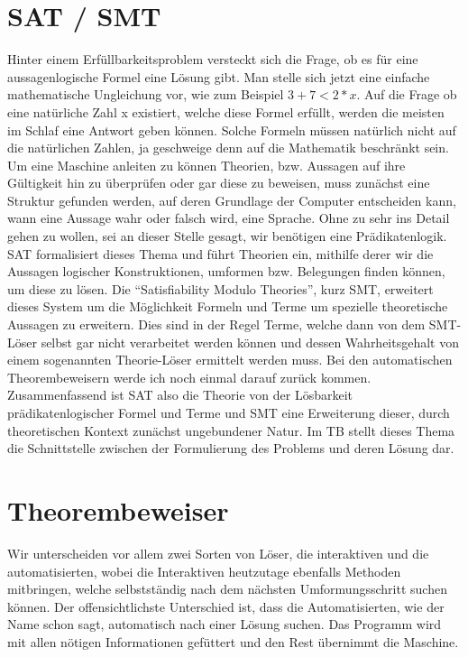 \section{SAT / SMT}
Hinter einem Erfüllbarkeitsproblem versteckt sich die Frage, ob es für eine aussagenlogische Formel eine Lösung gibt. Man stelle sich jetzt eine einfache
mathematische Ungleichung vor, wie zum Beispiel $3+7<2*x$. Auf die Frage ob eine natürliche Zahl x existiert, welche diese Formel erfüllt, werden die meisten im Schlaf
eine Antwort geben können. Solche Formeln müssen natürlich nicht auf die natürlichen Zahlen, ja geschweige denn auf die Mathematik beschränkt sein.
Um eine Maschine anleiten zu können Theorien, bzw. Aussagen auf ihre Gültigkeit hin zu überprüfen oder gar diese zu beweisen, muss zunächst eine Struktur
gefunden werden, auf deren Grundlage der Computer entscheiden kann, wann eine Aussage wahr oder falsch wird, eine Sprache. Ohne zu sehr ins Detail gehen zu
wollen, sei an dieser Stelle gesagt, wir benötigen eine Prädikatenlogik. SAT formalisiert dieses Thema und führt Theorien ein, mithilfe derer wir die Aussagen
logischer Konstruktionen, umformen bzw. Belegungen finden können, um diese zu lösen.
Die \enquote{Satisfiability Modulo Theories}, kurz SMT, erweitert dieses System um die Möglichkeit Formeln und Terme um spezielle theoretische Aussagen zu erweitern.
Dies sind in der Regel Terme, welche dann von dem SMT-Löser selbst gar nicht verarbeitet werden können und dessen Wahrheitsgehalt von einem sogenannten
Theorie-Löser ermittelt werden muss. Bei den automatischen Theorembeweisern werde ich noch einmal darauf zurück kommen.
Zusammenfassend ist SAT also die Theorie von der Lösbarkeit prädikatenlogischer Formel und Terme und SMT eine Erweiterung dieser, durch theoretischen Kontext zunächst ungebundener Natur. Im TB stellt dieses Thema die Schnittstelle zwischen der Formulierung des Problems und deren Lösung dar.

\section{Theorembeweiser}
Wir unterscheiden vor allem zwei Sorten von Löser, die interaktiven und die automatisierten, wobei die Interaktiven heutzutage ebenfalls Methoden mitbringen, welche selbstständig nach dem nächsten Umformungsschritt suchen können. Der offensichtlichste Unterschied ist, dass die Automatisierten, wie der Name schon sagt, automatisch nach einer Lösung suchen. Das Programm wird mit allen nötigen Informationen gefüttert und den Rest übernimmt die Maschine.

